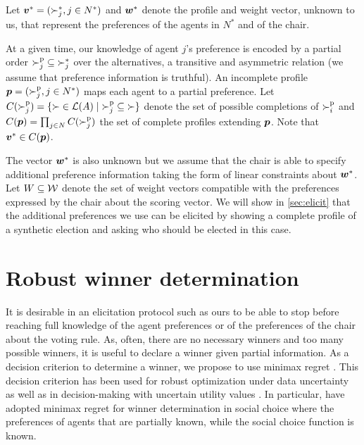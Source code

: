 \documentclass{article}
\begin{document}
Let $\bm{v}^* = (\succ_j^*, j \in N^*)$ and $\bm{w}^*$ denote the profile and weight vector, unknown to us, that represent the preferences of the agents in $N^*$ and of the chair. 

At a given time, our knowledge of agent $j$'s preference is encoded by a partial order ${\succ^\text{p}_j} \subseteq {\succ_j^*}$ over the alternatives, a transitive and asymmetric relation (we assume that preference information is truthful).
An incomplete profile ${\bm{p}} = (\succ^\text{p}_j, j \in N^*)$ maps each agent to a partial preference.
Let $C(\ppref_j) = \set{{\succ} \in \linors \suchthat {\ppref_j} \subseteq {\succ}}$ denote the set of possible completions of $\succ^\text{p}_i$ and $C({\bm{p}}) = \prod_{j \in N} C(\succ^\text{p}_j)$ the set of complete profiles extending ${\bm{p}}$. Note that $\bm{v}^* \in C({\bm{p}})$.

The vector $\bm{w}^*$  is also unknown but we assume that the chair is able to specify additional preference information taking the form of linear constraints about $\bm{w}^*$. Let $W \subseteq \mathcal{W}$ denote the set of weight vectors compatible with the preferences expressed by the chair about the scoring vector.
We will show in \cref{sec:elicit} that the additional preferences we use can be elicited by showing a complete profile of a synthetic election and asking who should be elected in this case.

\section{Robust winner determination}
\label{sec:mmr}
It is desirable in an elicitation protocol such as ours to be able to stop before reaching full knowledge of the agent preferences or of the preferences of the chair about the voting rule. As, often, there are no necessary winners and too many possible winners, it is useful to declare a winner given partial information.
As a decision criterion to determine a winner, we propose to use minimax regret \citep{Savage1954}. 
This decision criterion has been used for robust optimization under data uncertainty \citep{Kouvelis1997} as well as in decision-making with uncertain utility values \citep{Salo2001,Boutilier2006}.
In particular, \citet{Lu2011} have adopted minimax regret for winner determination in social choice where
the preferences of agents that are partially known, while the social choice function is known.
\end{document}
